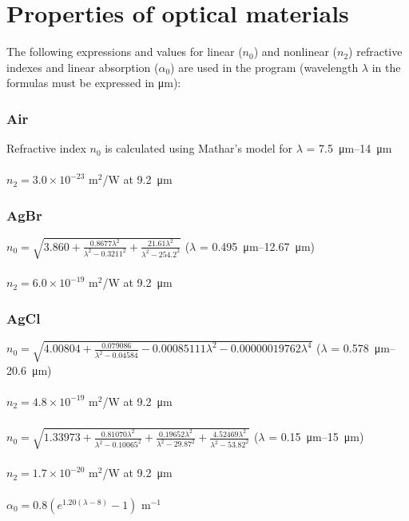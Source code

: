 \chapter{Properties of optical materials}
\label{appendix:optical_constants}
The following expressions and values for linear ($n_0$) and nonlinear ($n_2$) refractive indexes and linear absorption ($\alpha_0$) are used in the program (wavelength $\lambda$ in the formulas must be expressed in \si{\micro\meter}):

\subsection*{Air}
Refractive index $n_0$ is calculated using Mathar's model for \(\lambda\) = \SIrange{7.5}{14}{\micro\meter} \cite{Mathar-2007}\\
\\
$n_2 = 3.0\times 10^{-23}$ m$^2$/W at \SI{9.2}{\micro\meter} \cite{Polyanskiy-2021a}

\subsection*{AgBr}
$n_0=\sqrt{3.860 + \frac{0.8677\lambda^2}{\lambda^2-0.3211^2} + \frac{21.61\lambda^2}{\lambda^2-254.2^2}}$ (\(\lambda\) = \SIrange{0.495}{12.67}{\micro\meter}) \cite{Polyanskiy-2024}\\
\\
$n_2 = 6.0\times 10^{-19}$ m$^2$/W at \SI{9.2}{\micro\meter} \cite{Polyanskiy-2024}

\subsection*{AgCl}
$n_0=\sqrt{4.00804+\frac{0.079086}{\lambda^2-0.04584}-0.00085111\lambda^2-0.00000019762\lambda^4}$ (\(\lambda\) = \SIrange{0.578}{20.6}{\micro\meter}) \cite{Tilton-1950}\\
\\
$n_2 = 4.8\times 10^{-19}$ m$^2$/W at \SI{9.2}{\micro\meter} \cite{Polyanskiy-2024}

\subsection*{}
$n_0=\sqrt{1.33973+\frac{0.81070\lambda^2}{\lambda^2-0.10065^2}+\frac{0.19652\lambda^2}{\lambda^2-29.87^2}+\frac{4.52469\lambda^2}{\lambda^2-53.82^2}}$ (\(\lambda\) = \SIrange{0.15}{15}{\micro\meter}) \cite{Li-1980}\\
\\
$n_2 = 1.7\times 10^{-20}$ m$^2$/W at \SI{9.2}{\micro\meter} \cite{Polyanskiy-2021b}\\
\\
$\alpha_0 = 0.8 (e^{1.20(\lambda-8)}-1)$ m$^{-1}$ \cite{Polyanskiy-2024}

